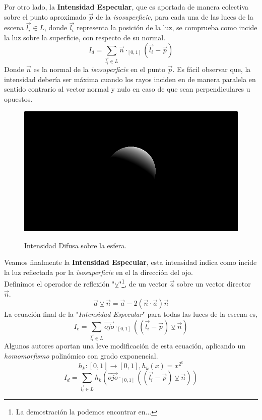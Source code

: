 Por otro lado, la \textbf{Intensidad Especular}, que es aportada de manera colectiva sobre el punto aproximado \(\Vec{p}\) de la \textit{isosuperficie}, para cada una de las luces de la escena \(\Vec{l_i}\in L\), donde \(\Vec{l_i}\) representa la posición de la luz, se comprueba como incide la luz sobre la superficie, con respecto de su normal. 
\[I_d = \sum_{\Vec{l_i}\in L} \Vec{n}\cdot_{[0, 1]}(\Vec{l_i}-\Vec{p})\]
Donde \(\Vec{n}\) es la normal de la \textit{isosuperficie} en el punto \(\Vec{p}\). Es fácil observar que, la intensidad debería ser máxima cuando los rayos inciden en de manera paralela en sentido contrario al vector normal y nulo en caso de que sean perpendiculares u opuestos.
\begin{figure}[H]
  \centering
  \captionsetup{justification=centering}%
  \includegraphics[width=1.0\textwidth]{secciones/imagenes/lightmodel/difusa.png}\label{fig:difusse}
  \caption{Intensidad Difusa sobre la esfera.}
\end{figure}
Veamos finalmente la \textbf{Intensidad Especular}, esta intensidad indica como incide la luz reflectada  por la \textit{isosuperficie} en el la dirección del ojo.\\
Definimos el operador de reflexión "\(\veebar\)"\footnote{La demostración la podemos encontrar en...}, de un vector \(\Vec{a}\) sobre un vector director \(\Vec{n}\).
\[\Vec{a}\veebar\Vec{n}=\Vec{a} - 2(\Vec{n} \cdot \Vec{a})\Vec{n}\]
La ecuación final de la "\textit{Intensidad Especular}" para todas las luces de la escena es,
\[I_e = \sum_{\Vec{l_i}\in L} \Vec{ojo}\cdot_{[0, 1]}\left(\left(\Vec{l_i}-\Vec{p}\right) \veebar \Vec{n}\right)\]
Algunos autores aportan una leve modificación de esta ecuación, aplicando un \textit{homomorfismo} polinómico con grado exponencial.
\[h_k:[0,1]\longrightarrow[0,1] , h_k(x)=x^{2^k}\]
\[I_d = \sum_{\Vec{l_i}\in L} h_k\left(\Vec{ojo}\cdot_{[0, 1]}\left(\left(\Vec{l_i}-\Vec{p}\right) \veebar \Vec{n}\right)\right)\]
